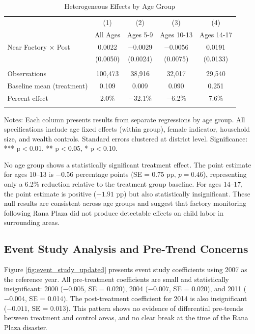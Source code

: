 \documentclass[12pt]{article}
\begin{document}
\begin{table}[H]
\centering
\caption{Heterogeneous Effects by Age Group}
\label{tab:age_hetero_updated}
\begin{threeparttable}
\begin{tabular}{lcccc}
\toprule
& (1) & (2) & (3) & (4) \\
& All Ages & Ages 5-9 & Ages 10-13 & Ages 14-17 \\
\midrule
Near Factory $\times$ Post & 0.0022 & $-$0.0029 & $-$0.0056 & 0.0191 \\
& (0.0050) & (0.0024) & (0.0075) & (0.0133) \\
\\
\midrule
Observations & 100,473 & 38,916 & 32,017 & 29,540 \\
Baseline mean (treatment) & 0.109 & 0.009 & 0.090 & 0.251 \\
Percent effect & 2.0\% & $-$32.1\% & $-$6.2\% & 7.6\% \\
\\
\bottomrule
\end{tabular}
\begin{tablenotes}
\footnotesize
\item Notes: Each column presents results from separate regressions by age group. All specifications include age fixed effects (within group), female indicator, household size, and wealth controls. Standard errors clustered at district level. Significance: *** p$<$0.01, ** p$<$0.05, * p$<$0.10.
\end{tablenotes}
\end{threeparttable}
\end{table}

No age group shows a statistically significant treatment effect. The point estimate for ages 10--13 is $-0.56$ percentage points (SE = 0.75 pp, $p = 0.46$), representing only a 6.2\% reduction relative to the treatment group baseline. For ages 14--17, the point estimate is positive ($+1.91$ pp) but also statistically insignificant. These null results are consistent across age groups and suggest that factory monitoring following Rana Plaza did not produce detectable effects on child labor in surrounding areas.

\subsection{Event Study Analysis and Pre-Trend Concerns}

Figure \ref{fig:event_study_updated} presents event study coefficients using 2007 as the reference year. All pre-treatment coefficients are small and statistically insignificant: 2000 ($-0.005$, SE = 0.020), 2004 ($-0.007$, SE = 0.020), and 2011 ($-0.004$, SE = 0.014). The post-treatment coefficient for 2014 is also insignificant ($-0.011$, SE = 0.013). This pattern shows no evidence of differential pre-trends between treatment and control areas, and no clear break at the time of the Rana Plaza disaster.
\end{document}
